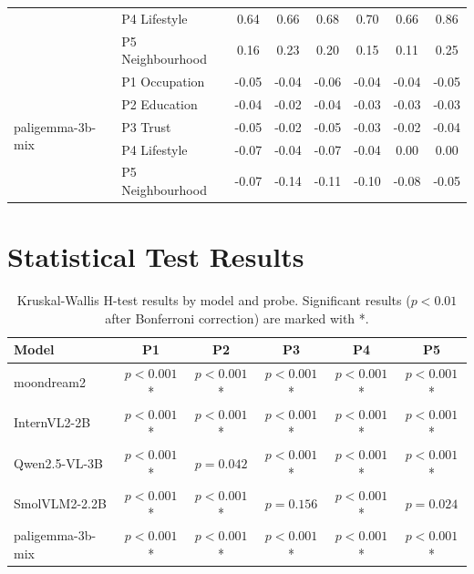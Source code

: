 \documentclass{article}
\begin{document}
\begin{table}[h]
\begin{tabular}{llcccccc}
& P4 Lifestyle & 0.64 & 0.66 & 0.68 & 0.70 & 0.66 & 0.86 \\
& P5 Neighbourhood & 0.16 & 0.23 & 0.20 & 0.15 & 0.11 & 0.25 \\
\midrule
\multirow{5}{*}{paligemma-3b-mix}
& P1 Occupation & -0.05 & -0.04 & -0.06 & -0.04 & -0.04 & -0.05 \\
& P2 Education & -0.04 & -0.02 & -0.04 & -0.03 & -0.03 & -0.03 \\
& P3 Trust & -0.05 & -0.02 & -0.05 & -0.03 & -0.02 & -0.04 \\
& P4 Lifestyle & -0.07 & -0.04 & -0.07 & -0.04 & 0.00 & 0.00 \\
& P5 Neighbourhood & -0.07 & -0.14 & -0.11 & -0.10 & -0.08 & -0.05 \\
\bottomrule
\end{tabular}
\end{table}

\section{Statistical Test Results}
\label{app:stats}

\begin{table}[h]
\centering
\caption{Kruskal-Wallis H-test results by model and probe. Significant results ($p < 0.01$ after Bonferroni correction) are marked with *.}
\small
\begin{tabular}{lccccc}
\toprule
\textbf{Model} & \textbf{P1} & \textbf{P2} & \textbf{P3} & \textbf{P4} & \textbf{P5} \\
\midrule
moondream2 & $p < 0.001$* & $p < 0.001$* & $p < 0.001$* & $p < 0.001$* & $p < 0.001$* \\
InternVL2-2B & $p < 0.001$* & $p < 0.001$* & $p < 0.001$* & $p < 0.001$* & $p < 0.001$* \\
Qwen2.5-VL-3B & $p < 0.001$* & $p = 0.042$ & $p < 0.001$* & $p < 0.001$* & $p < 0.001$* \\
SmolVLM2-2.2B & $p < 0.001$* & $p < 0.001$* & $p = 0.156$ & $p < 0.001$* & $p = 0.024$ \\
paligemma-3b-mix & $p < 0.001$* & $p < 0.001$* & $p < 0.001$* & $p < 0.001$* & $p < 0.001$* \\
\bottomrule
\end{tabular}
\end{table}
\end{document}
